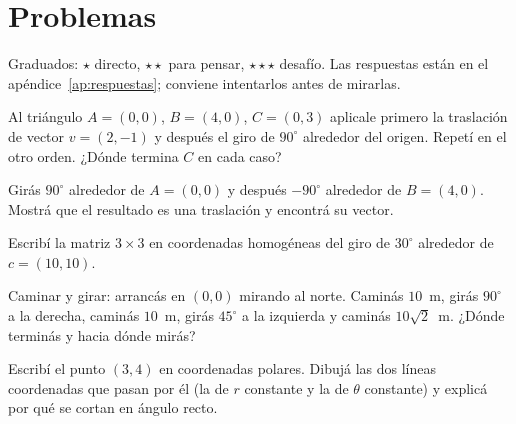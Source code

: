 \section{Problemas}\label{sec:problemas-02}

Graduados: \({\star}\) directo, \({\star}{\star}\) para pensar, \({\star}{\star}{\star}\) desafío. Las respuestas están en el apéndice~\ref{ap:respuestas}; conviene intentarlos antes de mirarlas.

\begin{problema}[\({\star}\)]\label{pb:02-1}
Al triángulo \(A=(0,0)\), \(B=(4,0)\), \(C=(0,3)\) aplicale primero la traslación de vector \(v=(2,-1)\) y después el giro de \(90^\circ\) alrededor del origen. Repetí en el otro orden. ¿Dónde termina \(C\) en cada caso?
\end{problema}

\begin{problema}[\({\star}{\star}\)]\label{pb:02-2}
Girás \(90^\circ\) alrededor de \(A=(0,0)\) y después \(-90^\circ\) alrededor de \(B=(4,0)\). Mostrá que el resultado es una traslación y encontrá su vector.
\end{problema}

\begin{problema}[\({\star}{\star}\)]\label{pb:02-3}
Escribí la matriz \(3\times3\) en coordenadas homogéneas del giro de \(30^\circ\) alrededor de \(c=(10,10)\).
\end{problema}

\begin{problema}[\({\star}{\star}\)]\label{pb:02-4}
Caminar y girar: arrancás en \((0,0)\) mirando al norte. Caminás \(10\)~m, girás \(90^\circ\) a la derecha, caminás \(10\)~m, girás \(45^\circ\) a la izquierda y caminás \(10\sqrt2\)~m. ¿Dónde terminás y hacia dónde mirás?
\end{problema}

\begin{problema}[\({\star}{\star}{\star}\)]\label{pb:02-5}
Escribí el punto \((3,4)\) en coordenadas polares. Dibujá las dos líneas coordenadas que pasan por él (la de \(r\) constante y la de \(\theta\) constante) y explicá por qué se cortan en ángulo recto.
\end{problema}
